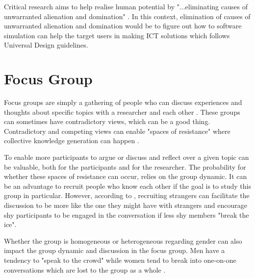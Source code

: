 
Critical research aims to help realise human potential by "...eliminating causes of unwarranted alienation and domination" \textcite{myers_set_2011}. In this context, elimination of causes of unwarranted alienation and domination would be to figure out how to software simulation can help the target users in making ICT solutions which follows Universal Design guidelines. 






\section{Focus Group}
Focus groups are simply a gathering of people who can discuss experiences and thoughts about specific topics with a researcher and each other \textcite[90]{CrangMike2007De}. These groups can sometimes have contradictory views, which can be a good thing. Contradictory and competing views can enable "spaces of resistance" where collective knowledge generation can happen \parencite[90]{CrangMike2007De}. 

To enable more participants to argue or discuss and reflect over a given topic can be valuable, both for the participants and for the researcher. The probability for whether these spaces of resistance can occur, relies on the group dynamic. It can be an advantage to recruit people who know each other if the goal is to study this group in particular. However, according to \textcite{CrangMike2007De}, recruiting strangers can facilitate the discussion to be more like the one they might have with strangers and encourage shy participants to be engaged in the conversation if less shy members "break the ice".

Whether the group is homogeneous or heterogeneous regarding gender can also impact the group dynamic and discussion in the focus group. Men have a tendency to "speak to the crowd" while women tend to break into one-on-one conversations which are lost to the group as a whole \parencite[92]{CrangMike2007De}.

